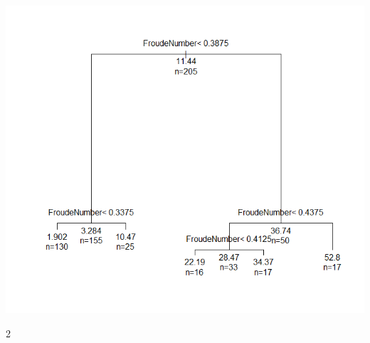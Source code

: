 \documentclass[twoside]{article}
\begin{document}
\begin{multicols}{2}
\includegraphics[scale=0.4]{images/pic_36.png}

\end{multicols}{2}
\end{document}
